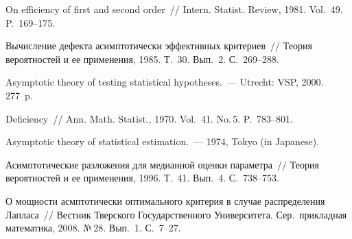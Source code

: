 \begin{multicols}{2}
{{\begin{thebibliography}{99}
 On efficiency of first and second order~//
Intern. Statist. Review, 1981. Vol.~49. P.~169--175.

Вычисление дефекта асимптотически
эффективных критериев~// Теория
вероятностей и ее применения, 1985. Т.~30. Вып.~2. С.~269--288.

Asymptotic theory of testing statistical
hypotheses.~---  Utrecht: VSP, 2000. 277~p.

Deficiency~// Ann. Math. Statist., 1970. Vol.~41. No.\,5. P.~783--801.

Asymptotic theory of statistical
estimation.~--- 1974, Tokyo (in Japanese).

 Асимптотические разложения для медианной оценки параметра~//
Теория
вероятностей и ее применения, 1996. Т.~41. Вып.~4. С.~738--753.

\label{end\stat}

О мощности асмптотически оптимального
критерия в случае распределения Лапласа~//
Вестник Тверского  Государственного Университета.  Сер.\
прикладная математика, 2008.
№\,28. Вып.~1. С.~7--27.






\end{thebibliography}

} 
}
\end{multicols}